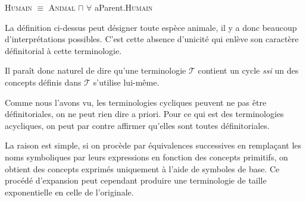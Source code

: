 \begin{exemple}
  \begin{center}
    \textsc{Humain} $\equiv$ \textsc{Animal} $\sqcap$ $\forall$ aParent.\textsc{Humain}
  \end{center}
\end{exemple}

\par La définition ci-dessus peut désigner toute espèce animale, il y a donc beaucoup d'interprétations possibles. C'est cette absence d'unicité qui enlève son caractère définitorial à cette terminologie.




\par Il paraît donc naturel de dire qu'une terminologie $\mathcal{T}$ contient un cycle \emph{ssi} un des concepts définis dans $\mathcal{T}$ s'utilise lui-même.

\par Comme nous l'avons vu, les terminologies cycliques peuvent ne pas être définitoriales, on ne peut rien dire a priori. Pour ce qui est des terminologies acycliques, on peut par contre affirmer qu'elles sont toutes définitoriales.

\par La raison est simple, si on procède par équivalences successives en remplaçant les noms symboliques par leurs expressions en fonction des concepts primitifs, on obtient des concepts exprimés uniquement à l'aide de symboles de base. Ce procédé d'expansion peut cependant produire une terminologie de taille exponentielle en celle de l'originale.

